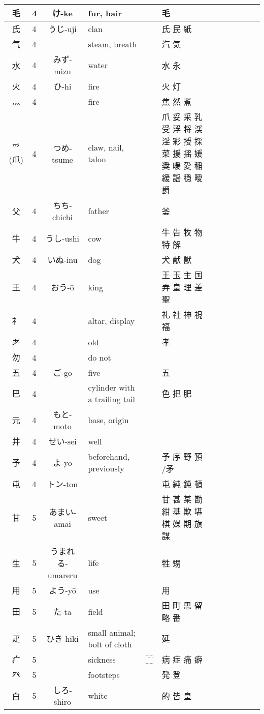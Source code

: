 \documentclass{article}
\begin{document}
{\begin{longtable}{|Cp{1.2cm}|Cp{0.3cm}|Cp{3cm}|Cp{5cm}|Cp{0.5cm}|Cp{5cm}|}
  毛 & 4 & け-ke & fur, hair &  & 毛 \\ \hline
  氏 & 4 & うじ-uji & clan &  & 氏 民 紙 \\ \hline
  气 & 4 &  & steam, breath &  & 汽 気 \\ \hline
  水 & 4 & みず-mizu & water &  & 水 永 \\ \hline
  火 & 4 & ひ-hi & fire &  & 火 灯 \\ \hline
  灬 & 4 &  & fire &  & 焦 然 煮 \\ \hline
  ⺤ (爪) & 4 & つめ-tsume & claw, nail, talon &  & 爪 妥 采 乳 受 浮 将 渓 淫 彩 授 採 菜 援 揺 媛 奨 暖 愛 稲 緩 謡 穏 曖 爵 \\ \hline
  父 & 4 & ちち-chichi & father &  & 釜 \\ \hline
  牛 & 4 & うし-ushi & cow &  & 牛 告 牧 物 特 解 \\ \hline
  犬 & 4 & いぬ-inu & dog &  & 犬 献 獣 \\ \hline
  王 & 4 & おう-ō & king &  & 王 玉 主 国 弄 皇 理 差 聖 \\ \hline
  礻 & 4 &  & altar, display &  & 礼 社 神 視 福 \\ \hline
  耂 & 4 &  & old &  & 孝 \\ \hline
  勿 & 4 &  & do not &  &  \\ \hline
  五 & 4 & ご-go & five &  & 五 \\ \hline
  巴 & 4 &  & cylinder with a trailing tail &  & 色 把 肥 \\ \hline
  元 & 4 & もと-moto & base, origin &  &  \\ \hline
  井 & 4 & せい-sei & well &  &  \\ \hline
  予 & 4 & よ-yo & beforehand, previously &  & 予 序 野 預 /矛 \\ \hline
  屯 & 4 & トン-ton &  &  & 屯 純 鈍 頓 \\ \hline
  甘 & 5 & あまい-amai & sweet &  & 甘 甚 某 勘 紺 基 欺 堪 棋 媒 期 旗 謀 \\ \hline
  生 & 5 & うまれる-umareru & life &  & 牲 甥 \\ \hline
  用 & 5 & よう-yō & use &  & 用 \\ \hline
  田 & 5 & た-ta & field &  & 田 町 思 留 略 番 \\ \hline
  疋 & 5 & ひき-hiki & small animal; bolt of cloth &  & 延 \\ \hline
  疒 & 5 &  & sickness & ⿸ & 病 症 痛 癖 \\ \hline
  癶 & 5 &  & footsteps &  & 発 登 \\ \hline
  白 & 5 & しろ-shiro & white &  & 的 皆 皇 \\ \hline

\end{longtable}}
\end{document}
